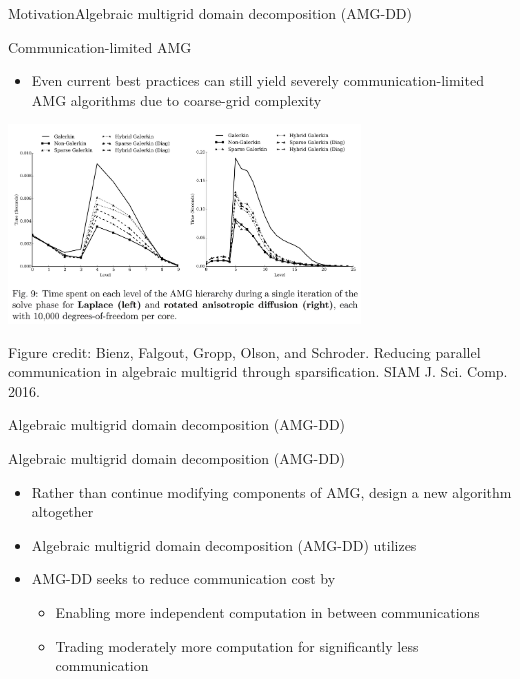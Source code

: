 \documentclass[18pt,xcolor=table]{beamer}
\begin{document}
\begin{frame}{MotivationAlgebraic multigrid domain decomposition (AMG-DD)}
\begin{block}{Communication-limited AMG}
\begin{itemize}
\item Even current best practices can still yield severely communication-limited AMG algorithms due to coarse-grid complexity
\end{itemize}
\end{block}

\begin{center}
\includegraphics[width=0.7\textwidth]{../figures/nonGalerkinFigure}
\end{center}
\tiny{Figure credit: Bienz, Falgout, Gropp, Olson, and Schroder. Reducing parallel communication in algebraic multigrid through sparsification. SIAM J. Sci. Comp. 2016.}

\end{frame}

\begin{frame}{Algebraic multigrid domain decomposition (AMG-DD)}
\begin{block}{Algebraic multigrid domain decomposition (AMG-DD)}
\begin{itemize}
\item Rather than continue modifying components of AMG, design a new algorithm altogether
\item Algebraic multigrid domain decomposition (AMG-DD) utilizes 
\item AMG-DD seeks to reduce communication cost by
\begin{itemize}
\item Enabling more independent computation in between communications
\item Trading moderately more computation for significantly less communication
\end{itemize}
\end{itemize}
\end{block}

\end{frame}
\end{document}
